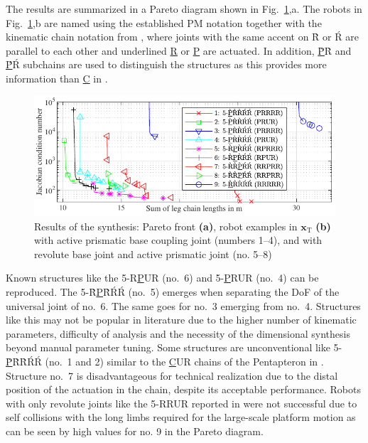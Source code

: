 \documentclass[
	graybox,
	vecphys] %
	{svmult}
\newcommand{\bm}[1]{\boldsymbol{#1}}
\begin{document}
The results are summarized in a Pareto diagram shown in Fig.~\ref{fig:results},a.
%
%
The robots in Fig.~\ref{fig:results},b are named using the established PM notation \cite{Merlet2006} together with the kinematic chain notation from \cite{KongGos2007}, where joints with the same accent on \`R or \'R are parallel to each other and underlined \underline{R} or \underline{P} are actuated.
In addition, \underline{\`P}\`R and \underline{\'P}\'R subchains are used to distinguish the structures as this provides more information than \underline{C} in \cite{MasoulehSaaGosTag2010}.

\begin{figure}[tb]
\centering
\includegraphics{pareto_all.pdf}

\caption{Results of the synthesis: Pareto front  \textbf{(a)}, robot examples in $\bm{x}_\mathrm{T}$ \textbf{(b)} with active prismatic base coupling joint (numbers 1--4), and with revolute base joint and active prismatic joint (no. 5--8)}
\label{fig:results}
\end{figure}

Known structures like the 5-R\underline{P}UR (no.~6) \cite{MasoulehGosHusWal2011,AmineMasCarWen2012,GallardoAlvaradoAbeIsl2019} and 5-\underline{P}RUR (no.~4) \cite{MasoulehSaaGosTag2010} can be reproduced.
The 5-{\`R}\underline{P}{\`R}{\'R}{\'R} (no.~5) emerges when separating the DoF of the universal joint of no.~6.
The same goes for no.~3 emerging from no.~4.
Structures like this may not be popular in literature due to the higher number of kinematic parameters, difficulty of analysis and the necessity of the dimensional synthesis beyond manual parameter tuning.
Some structures are unconventional like 5-\underline{\`P}{\`R}{\`R}{\'R}{\'R} (no.~1 and 2) similar to the \underline{C}UR chains of the Pentapteron in \cite{MasoulehSaaGosTag2010}.
Structure no.~7 is disadvantageous for technical realization due to the distal position of the actuation in the chain, despite its acceptable performance.
Robots with only revolute joints like the 5-RRUR reported in \cite{CaoDinYan2017} were not successful due to self collisions with the long limbs required for the large-scale platform motion as can be seen by high values for no. 9 in the Pareto diagram.
\end{document}
